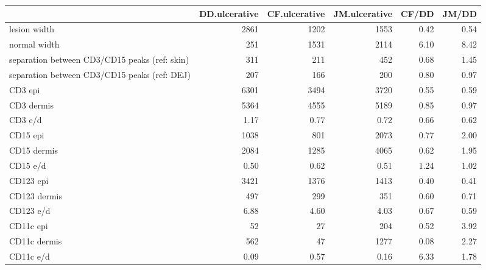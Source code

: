 \documentclass{article}
\begin{document}
\begin{tabular}{lrrrrr}
   \hline  &DD.ulcerative& CF.ulcerative& JM.ulcerative& CF/DD& JM/DD\\ 
\hline
lesion width & 2861 & 1202 & 1553 & 0.42 & 0.54 \\ 
  normal width & 251 & 1531 & 2114 & 6.10 & 8.42 \\ 
  separation between CD3/CD15 peaks (ref: skin) & 311 & 211 & 452 & 0.68 & 1.45 \\ 
  separation between CD3/CD15 peaks (ref: DEJ) & 207 & 166 & 200 & 0.80 & 0.97 \\ 
   \hline
CD3 epi & 6301 & 3494 & 3720 & 0.55 & 0.59 \\ 
  CD3 dermis & 5364 & 4555 & 5189 & 0.85 & 0.97 \\ 
  CD3 e/d & 1.17 & 0.77 & 0.72 & 0.66 & 0.62 \\ 
   \hline
CD15 epi & 1038 & 801 & 2073 & 0.77 & 2.00 \\ 
  CD15 dermis & 2084 & 1285 & 4065 & 0.62 & 1.95 \\ 
  CD15 e/d & 0.50 & 0.62 & 0.51 & 1.24 & 1.02 \\ 
   \hline
CD123 epi & 3421 & 1376 & 1413 & 0.40 & 0.41 \\ 
  CD123 dermis & 497 & 299 & 351 & 0.60 & 0.71 \\ 
  CD123 e/d & 6.88 & 4.60 & 4.03 & 0.67 & 0.59 \\ 
   \hline
CD11c epi & 52 & 27 & 204 & 0.52 & 3.92 \\ 
  CD11c dermis & 562 & 47 & 1277 & 0.08 & 2.27 \\ 
  CD11c e/d & 0.09 & 0.57 & 0.16 & 6.33 & 1.78 \\ 
   \hline
\end{tabular}
\end{document}
